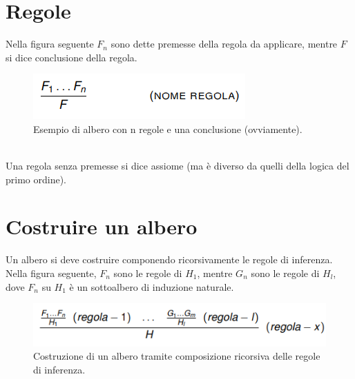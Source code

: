 \documentclass[12pt]{article}
\begin{document}
\section{Regole}
Nella figura seguente $F_n$ sono dette premesse della regola da applicare, mentre $F$ si dice conclusione della regola.\\
\begin{figure}[!htb]
    \centering
    \includegraphics[width=.9\linewidth,height=.40\textheight,keepaspectratio]{brutta/regole_albero.png} %
    \begin{center}
        \caption{\label{fig:regole_albero}Esempio di albero con n regole e una conclusione (ovviamente).} %
    \end{center}
\end{figure}\\
Una regola senza premesse si dice assiome (ma è diverso da quelli della logica del primo ordine).
\section{Costruire un albero}
Un albero si deve costruire componendo ricorsivamente le regole di inferenza. Nella figura seguente, $F_n$ sono le regole di $H_1$, mentre $G_n$ sono le regole di $H_l$, dove $F_n$ su $H_1$ è un sottoalbero di induzione naturale.
\begin{figure}[!htb]
    \centering
    \includegraphics[width=.9\linewidth,height=.40\textheight,keepaspectratio]{brutta/costruzione_ricorsiva.png} %
    \begin{center}
        \caption{\label{fig:albero_ricorsivamente}Costruzione di un albero tramite composizione ricorsiva delle regole di inferenza.} %
    \end{center}
\end{figure}
\pagebreak
\end{document}
